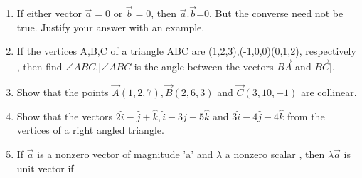 \begin{enumerate}[label=\thesection.\arabic*,ref=\thesection.\theenumi]
	\\
	\solution
		
\item If either vector $\overrightarrow {a}=0$ or $\overrightarrow {b}=0$, then $\overrightarrow {a}.\overrightarrow {b}$=0. But the converse need not be true. Justify your answer with an example.
	\\
	\solution
		
\item If the vertices A,B,C of a triangle ABC are (1,2,3),(-1,0,0)(0,1,2), respectively , then find  $\angle{ABC}. [\angle{ABC}$ is the angle between the vectors $\overrightarrow{BA}$ and $\overrightarrow{BC}$].
	\\
	\solution
		
\item Show that the points $\vec{A}(1,2,7), \vec{B}(2,6,3)$ and $\vec{C}(3,10,-1)$ are collinear.
	\\
	\solution
		
\item Show that the vectors $2\hat{i}-\hat{j}+\hat{k},\hat{i}-3\hat{j}-5\hat{k}$ and  $3\hat{i}-4\hat{j}-4\hat{k}$ from the vertices of a right angled triangle.
	\\
	\solution
		
\item If $\overrightarrow {a}$ is a nonzero vector of magnitude 'a' and $\lambda$ a nonzero scalar , then $\lambda\overrightarrow {a}$ is unit vector if


\end{enumerate}
